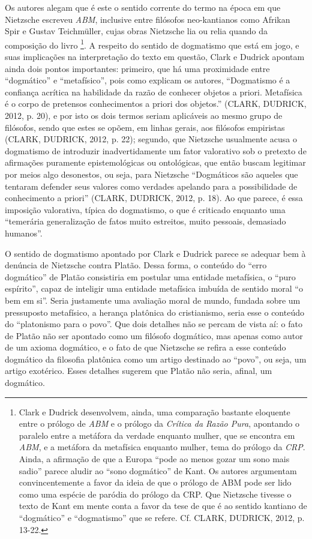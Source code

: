\documentclass[
	12pt,				%
	openright,			%
	oneside,			%
	a4paper,			%
	english,			%
	french,				%
	spanish,			%
	brazil				%
	]{abntex2}
\begin{document}
Os autores alegam que é este o sentido corrente do termo na época em que Nietzsche escreveu \textit{ABM}, inclusive entre filósofos neo-kantianos como Afrikan Spir e Gustav Teichmüller, cujas obras Nietzsche lia ou relia quando da composição do livro
\footnote{Clark e Dudrick desenvolvem, ainda, uma comparação bastante eloquente entre o prólogo de \textit{ABM} e o prólogo da \textit{Crítica da Razão Pura}, apontando o paralelo entre a metáfora da verdade enquanto mulher, que se encontra em \textit{ABM}, e a metáfora da metafísica enquanto mulher, tema do prólogo da \textit{CRP}. Ainda, a afirmação de que a Europa “pode ao menos gozar um sono mais sadio” parece aludir ao “sono dogmático” de Kant. Os autores argumentam convincentemente a favor da ideia de que o prólogo de ABM pode ser lido como uma espécie de paródia do prólogo da CRP. Que Nietzsche tivesse o texto de Kant em mente conta a favor da tese de que é ao sentido kantiano de “dogmático” e “dogmatismo” que se refere. Cf. CLARK, DUDRICK, 2012, p. 13-22.}. 
A respeito do sentido de dogmatismo que está em jogo, e suas implicações na interpretação do texto em questão, Clark e Dudrick apontam ainda dois pontos importantes: primeiro, que há uma proximidade entre “dogmático” e “metafísico”, pois como explicam os autores, “Dogmatismo é a confiança acrítica na habilidade da razão de conhecer objetos a priori. Metafísica é o corpo de pretensos conhecimentos a priori dos objetos.” (CLARK, DUDRICK, 2012, p. 20), e por isto os dois termos seriam aplicáveis ao mesmo grupo de filósofos, sendo que estes se opõem, em linhas gerais, aos filósofos empiristas (CLARK, DUDRICK, 2012, p. 22); segundo, que Nietzsche usualmente acusa o dogmatismo de introduzir inadvertidamente um fator valorativo sob o pretexto de afirmações puramente epistemológicas ou ontológicas, que então buscam legitimar por meios algo desonestos, ou seja, para Nietzsche “Dogmáticos são aqueles que tentaram defender seus valores como verdades apelando para a possibilidade de conhecimento a priori” (CLARK, DUDRICK, 2012, p. 18). Ao que parece, é essa imposição valorativa, típica do dogmatismo, o que é criticado enquanto uma “temerária generalização de fatos muito estreitos, muito pessoais, demasiado humanos”.

O sentido de dogmatismo apontado por Clark e Dudrick parece se adequar bem à denúncia de Nietzsche contra Platão. Dessa forma, o conteúdo do “erro dogmático” de Platão consistiria em postular uma entidade metafísica, o “puro espírito”, capaz de inteligir uma entidade metafísica imbuída de sentido moral “o bem em si”. Seria justamente uma avaliação moral de mundo, fundada sobre um pressuposto metafísico, a herança platônica do cristianismo, seria esse o conteúdo do “platonismo para o povo”. Que dois detalhes não se percam de vista aí: o fato de Platão não ser apontado como um filósofo dogmático, mas apenas como autor de um axioma dogmático, e o fato de que Nietzsche se refira a esse conteúdo dogmático da filosofia platônica como um artigo destinado ao “povo”, ou seja, um artigo exotérico. Esses detalhes sugerem que Platão não seria, afinal, um dogmático.
\end{document}
